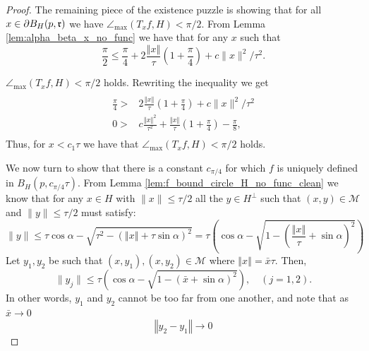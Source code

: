 \documentclass[12pt]{article}
\theoremstyle{remark}
\newcommand{\MM}{\mathcal{M}}
\newcommand{\norm}[1]{\left\Vert #1 \right\Vert}
\newcommand{\maxangle}{\angle_{\max}}
\begin{document}
\begin{appendices}
\begin{proof}
The remaining piece of the existence puzzle is showing that for all $x\in\partial B_H(p, \frak{r})$ we have $\maxangle(T_x f, H) < \pi/2$.
From Lemma \ref{lem:alpha_beta_x_no_func} we have that for any $x$ such that 
\[
       \frac{\pi}{2} \leq \frac{\pi}{4}+ 2\frac{\norm{x}}{\tau}(1 + \frac{\pi}{4})  +c\|x\|^2/\tau^2
	 .\]

$\maxangle(T_xf,H) <\pi/2$ holds.
Rewriting the inequality we get
\[
\begin{array}{cc}
      \\
    \frac{\pi}{4} > & 2\frac{\norm{x}}{\tau}(1 + \frac{\pi}{4})  +c\|x\|^2/\tau^2\\
    0 > & c\frac{\norm{x}^2}{\tau^2} +  \frac{\norm{x}}{\tau} (1 + \frac{\pi}{4}) - \frac{\pi}{8},\\
\end{array}
\]
Thus, for $x< c_1 \tau$ we have that  $\maxangle(T_xf,H) <\pi/2$ holds.


We now turn to show that there is a constant $c_{\pi/4}$ for which $f$ is uniquely defined in $B_H(p, c_{\pi/4}\tau)$.
From Lemma \ref{lem:f_bound_circle_H_no_func_clean} we know that for any $x \in H$ with $\|x\|\leq \tau/2$ all the $y\in H^\perp$ such that $(x,y)\in\MM$ and $\|y\| \leq \tau/2$ must satisfy:
\begin{equation}
    \|y\| \leq \tau\cos\alpha-\sqrt{\tau^2-(\norm{x} + \tau\sin\alpha)^2} = \tau\left(\cos\alpha-\sqrt{1-(\frac{\norm{x}}{\tau} + \sin\alpha)^2}\right)
\end{equation}
Let $y_1, y_2$ be such that $(x,y_1),(x,y_2)\in\MM$ where $\norm{x}=\bar x\tau$.
Then,
\begin{equation}
    \|y_j\| \leq \tau\left(\cos\alpha-\sqrt{1-(\bar x+ \sin\alpha)^2}\right),\quad (j=1,2)
.\end{equation}
In other words, $y_1$ and $y_2$ cannot be too far from one another, and note that as $\bar x \to 0$
\begin{equation}\label{eq:y2_y1_diff}
\norm{y_2 - y_1} \to 0
\end{equation}


\end{proof}
\end{appendices}
\end{document}
